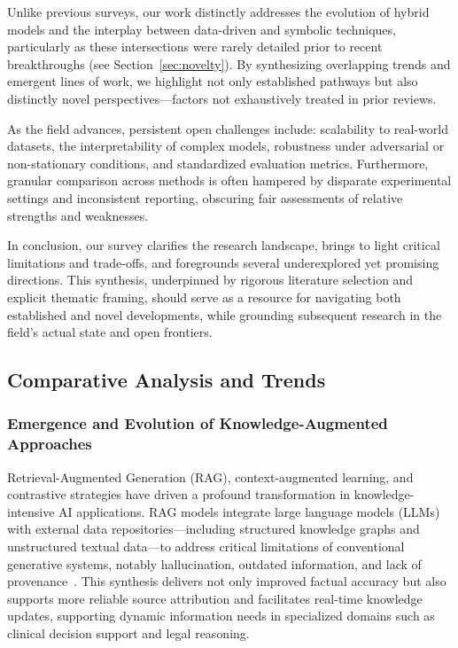 \documentclass[sigconf]{acmart}
\begin{document}
Unlike previous surveys, our work distinctly addresses the evolution of hybrid models and the interplay between data-driven and symbolic techniques, particularly as these intersections were rarely detailed prior to recent breakthroughs (see Section~\ref{sec:novelty}). By synthesizing overlapping trends and emergent lines of work, we highlight not only established pathways but also distinctly novel perspectives—factors not exhaustively treated in prior reviews.

As the field advances, persistent open challenges include: scalability to real-world datasets, the interpretability of complex models, robustness under adversarial or non-stationary conditions, and standardized evaluation metrics. Furthermore, granular comparison across methods is often hampered by disparate experimental settings and inconsistent reporting, obscuring fair assessments of relative strengths and weaknesses.

In conclusion, our survey clarifies the research landscape, brings to light critical limitations and trade-offs, and foregrounds several underexplored yet promising directions. This synthesis, underpinned by rigorous literature selection and explicit thematic framing, should serve as a resource for navigating both established and novel developments, while grounding subsequent research in the field's actual state and open frontiers.

\subsection{Comparative Analysis and Trends}

\subsubsection{Emergence and Evolution of Knowledge-Augmented Approaches}

Retrieval-Augmented Generation (RAG), context-augmented learning, and contrastive strategies have driven a profound transformation in knowledge-intensive AI applications. RAG models integrate large language models (LLMs) with external data repositories—including structured knowledge graphs and unstructured textual data—to address critical limitations of conventional generative systems, notably hallucination, outdated information, and lack of provenance~\cite{ref4,ref14,ref15,ref28,ref36,ref54,ref61,ref62,ref63,ref64}. This synthesis delivers not only improved factual accuracy but also supports more reliable source attribution and facilitates real-time knowledge updates, supporting dynamic information needs in specialized domains such as clinical decision support and legal reasoning.
\end{document}
